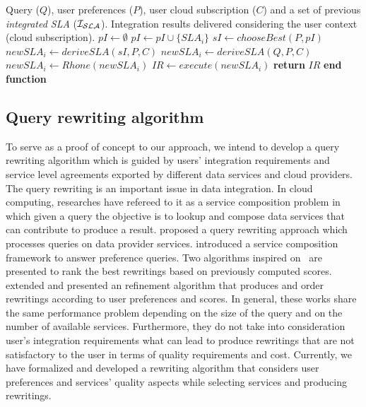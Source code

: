 \begin{algorithm} 
\caption{ - \ldots}
\label{qualityBasedAlgorithm}
\begin{algorithmic}[1]
\REQUIRE Query ($Q$), user preferences ($P$), user cloud subscription ($C$) and a set of previous \textit{integrated SLA} ($\bigSLA$).
\ENSURE Integration results delivered considering the user context (cloud subscription).
\STATE $pI \leftarrow \emptyset$
		\STATE $pI \leftarrow pI \cup \lbrace SLA_{i} \rbrace$		
	\ENDIF
\ENDFOR
{}
	\STATE $sI \leftarrow chooseBest(P, pI)$
	\STATE $newSLA_{i} \leftarrow deriveSLA(sI, P, C)$
\ELSE
	\STATE $newSLA_{i} \leftarrow deriveSLA(Q, P, C)$
	\STATE $newSLA_{i} \leftarrow Rhone(newSLA_{i})$
\ENDIF
\STATE $IR \leftarrow execute(newSLA_{i})$
\STATE \textbf{return} $IR$
\STATE \textbf{end function}
\end{algorithmic}
\end{algorithm} 

\subsection{Query rewriting algorithm}
To serve as a proof of concept to our approach, we intend to develop a query
rewriting algorithm which is guided by users' integration requirements and
service level agreements exported by different data services and cloud
providers. The query rewriting is an important issue in data integration. In
cloud computing, researches have refereed to it as a service composition problem
in which given a query the objective is to lookup and compose data services that
can contribute to produce a result. \cite{Barhamgi2010} proposed a query
rewriting approach which processes queries on data provider services.
\cite{Benouaret2011} introduced a service composition framework to answer
preference queries. Two algorithms inspired on~\cite{Barhamgi2010} are presented
to rank the best rewritings based on previously computed scores. \cite{ba2014}
extended \cite{Umberto} and presented an refinement algorithm that produces and
order rewritings according to user preferences and scores. In general, these
works share the same performance problem depending on the size of the query and
on the number of available services. Furthermore, they do not take into
consideration user's integration requirements what can lead to produce
rewritings that are not satisfactory to the user in terms of quality
requirements and cost. Currently, we have formalized and developed a rewriting
algorithm that considers user preferences and services' quality aspects while
selecting services and producing rewritings.                    